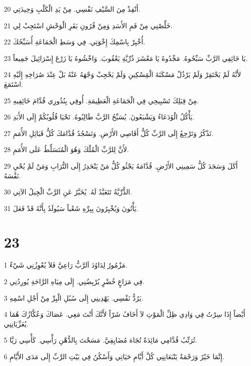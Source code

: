 \par 20 أَنْقِذْ مِنَ السَّيْفِ نَفْسِي. مِنْ يَدِ الْكَلْبِ وَحِيدَتِي.
\par 21 خَلِّصْنِي مِنْ فَمِ الأَسَدِ وَمِنْ قُرُونِ بَقَرِ الْوَحْشِ اسْتَجِبْ لِي.
\par 22 أُخْبِرْ بِاسْمِكَ إِخْوَتِي. فِي وَسَطِ الْجَمَاعَةِ أُسَبِّحُكَ.
\par 23 يَا خَائِفِي الرَّبِّ سَبِّحُوهُ. مَجِّدُوهُ يَا مَعْشَرَ ذُرِّيَّةِ يَعْقُوبَ. وَاخْشُوهُ يَا زَرْعَ إِسْرَائِيلَ جَمِيعاً.
\par 24 لأَنَّهُ لَمْ يَحْتَقِرْ وَلَمْ يَرْذُلْ مَسْكَنَةَ الْمَِسْكِينِ وَلَمْ يَحْجِبْ وَجْهَهُ عَنْهُ بَلْ عِنْدَ صُرَاخِهِ إِلَيْهِ اسْتَمَعَ.
\par 25 مِنْ قِبَلِكَ تَسْبِيحِي فِي الْجَمَاعَةِ الْعَظِيمَةِ. أُوفِي بِنُذُورِي قُدَّامَ خَائِفِيهِ.
\par 26 يَأْكُلُ الْوُدَعَاءُ وَيَشْبَعُونَ. يُسَبِّحُ الرَّبَّ طَالِبُوهُ. تَحْيَا قُلُوبُكُمْ إِلَى الأَبَدِ.
\par 27 تَذْكُرُ وَتَرْجِعُ إِلَى الرَّبِّ كُلُّ أَقَاصِي الأَرْضِ. وَتَسْجُدُ قُدَّامَكَ كُلُّ قَبَائِلِ الأُمَمِ.
\par 28 لأَنَّ لِلرَّبِّ الْمُلْكَ وَهُوَ الْمُتَسَلِّطُ عَلَى الأُمَمِ.
\par 29 أَكَلَ وَسَجَدَ كُلُّ سَمِينِي الأَرْضِ. قُدَّامَهُ يَجْثُو كُلُّ مَنْ يَنْحَدِرُ إِلَى التُّرَابِ وَمَنْ لَمْ يُحْيِ نَفْسَهُ.
\par 30 الذُّرِّيَّةُ تَتَعَبَّدُ لَهُ. يُخَبَّرُ عَنِ الرَّبِّ الْجِيلُ الآتِي.
\par 31 يَأْتُونَ وَيُخْبِرُونَ بِبِرِّهِ شَعْباً سَيُولَدُ بِأَنَّهُ قَدْ فَعَلَ.

\chapter{23}

\par 1 مَزْمُورٌ لِدَاوُدَ اَلرَّبُّ رَاعِيَّ فَلاَ يُعْوِزُنِي شَيْءٌ.
\par 2 فِي مَرَاعٍ خُضْرٍ يُرْبِضُنِي. إِلَى مِيَاهِ الرَّاحَةِ يُورِدُنِي.
\par 3 يَرُدُّ نَفْسِي. يَهْدِينِي إِلَى سُبُلِ الْبِرِّ مِنْ أَجْلِ اسْمِهِ.
\par 4 أَيْضاً إِذَا سِرْتُ فِي وَادِي ظِلِّ الْمَوْتِ لاَ أَخَافُ شَرّاً لأَنَّكَ أَنْتَ مَعِي. عَصَاكَ وَعُكَّازُكَ هُمَا يُعَزِّيَانِنِي.
\par 5 تُرَتِّبُ قُدَّامِي مَائِدَةً تُجَاهَ مُضَايِقِيَّ. مَسَحْتَ بِالدُّهْنِ رَأْسِي. كَأْسِي رَيَّا.
\par 6 إِنَّمَا خَيْرٌ وَرَحْمَةٌ يَتْبَعَانِنِي كُلَّ أَيَّامِ حَيَاتِي وَأَسْكُنُ فِي بَيْتِ الرَّبِّ إِلَى مَدَى الأَيَّامِ.

